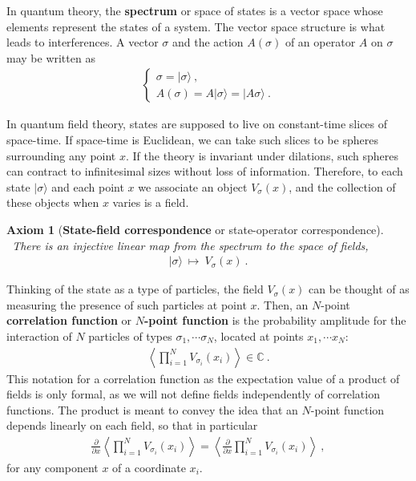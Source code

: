 \documentclass[12pt, a4paper, notitlepage, twoside]{report}
\numberwithin{equation}{section}
\theoremstyle{break}
\newtheorem{hyp}{Axiom}[chapter]
\begin{document}
In quantum theory, the \textbf{\boldmath spectrum} or space of states is a vector space whose elements represent the states of a system.
The vector space structure is what leads to interferences.
A vector $\sigma$ and the action $A(\sigma)$ of an operator $A$ on $\sigma$ may be written as 
\begin{align}
\left\{\begin{array}{l} 
 \sigma = |\sigma\rangle\ , \\ A(\sigma) = A|\sigma\rangle = |A\sigma\rangle\ .
\end{array}\right. 
\end{align}

In quantum field theory, states are supposed to live on constant-time slices of space-time. If space-time is Euclidean, we can take such slices to be spheres surrounding any point $x$. If the theory is invariant under dilations, such spheres can contract to infinitesimal sizes without loss of information. Therefore, to each state $|\sigma\rangle$ and each point $x$ we associate an object $V_\sigma(x)$, and the collection of these objects when $x$ varies is a field. 

\begin{hyp}[\textbf{\boldmath State-field correspondence} or state-operator correspondence]
~\label{ax:sfc}
 There is an injective linear map from the spectrum to the space of fields,
 \begin{align}
 |\sigma \rangle  \ \mapsto \ V_\sigma(x)\ .
\end{align}
\end{hyp} 
\noindent
Thinking of the state as a type of particles, the field $V_\sigma(x)$ can be thought of as measuring the presence of such particles at point $x$.
Then, an $N$-point \textbf{\boldmath correlation function} or \textbf{\boldmath $N$-point function} is the probability amplitude for the interaction of $N$ particles of types $\sigma_1,\cdots \sigma_N$, located at points $x_1,\cdots x_N$:
\begin{align}
\left\langle \prod_{i=1}^N V_{\sigma_i}(x_i)\right\rangle\in \mathbb{C}\ .
\label{pva}
\end{align}
This notation for a correlation function as the expectation value of a product of fields is only formal, as we will not define fields independently of correlation functions. The product is meant to convey the idea that an $N$-point function depends linearly on each field, so that in particular 
\begin{align}
 \frac{\partial}{\partial x} \left\langle \prod_{i=1}^N V_{\sigma_i}(x_i)\right\rangle = \left\langle \frac{\partial}{\partial x} \prod_{i=1}^N V_{\sigma_i}(x_i)\right\rangle\ ,
\end{align}
for any component $x$ of a coordinate $x_i$. 
\end{document}
